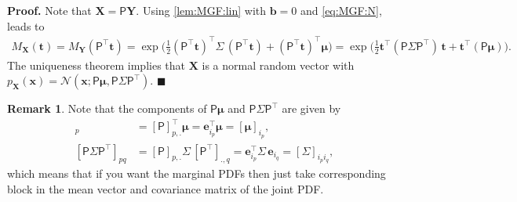 \documentclass[10pt]{article}
\theoremstyle{definition}
\newtheorem*{rem}{Remark}
\newenvironment{prf}{\noindent\textbf{Proof.}}{\hfill$\blacksquare$}
\begin{document}
\begin{prf}
Note that $\mathbf{X}=\mathsf{P}\mathbf{Y}$. Using \cref{lem:MGF:lin} with $\mathbf{b}=0$ and \cref{eq:MGF:N}, leads to
\begin{align*}
M_{\mathbf{X}}(\mathbf{t}) = M_{\mathbf{Y}}(\mathsf{P}^{\top}\mathbf{t})
= \exp\Big(\frac{1}{2}(\mathsf{P}^{\top}\mathbf{t})^{\top}\mathsf{\Sigma}\,(\mathsf{P}^{\top}\mathbf{t})
+(\mathsf{P}^{\top}\mathbf{t})^{\top}\boldsymbol{\mu}\Big)
= \exp\Big(\frac{1}{2}\mathbf{t}^{\top}(\mathsf{P}\mathsf{\Sigma}\mathsf{P}^{\top})\,\mathbf{t}
+\mathbf{t}^{\top}(\mathsf{P}\boldsymbol{\mu})\Big).
\end{align*}
The uniqueness theorem implies that $\mathbf{X}$ is a normal random vector with $p_{\mathbf{X}}(\mathbf{x})=\mathcal{N}(\mathbf{x};\mathsf{P}\boldsymbol{\mu},\mathsf{P}\mathsf{\Sigma}\mathsf{P}^{\top})$. 
\end{prf}
\begin{rem}
Note that the components of $\mathsf{P}\boldsymbol{\mu}$ and $\mathsf{P}\mathsf{\Sigma}\mathsf{P}^{\top}$ are given by
\begin{align*}
[\mathsf{P}\boldsymbol{\mu}]_p &= [\mathsf{P}]_{p,\boldsymbol{.}}^{\top}\boldsymbol{\mu} 
= \mathbf{e}_{i_p}^{\top}\boldsymbol{\mu} 
= [\boldsymbol{\mu}]_{i_p}, \\
[\mathsf{P}\mathsf{\Sigma}\mathsf{P}^{\top}]_{pq} &= [\mathsf{P}]_{p,\boldsymbol{.}}\mathsf{\Sigma}\,[\mathsf{P}^{\top}]_{\boldsymbol{.},q} 
= \mathbf{e}_{i_p}^{\top}\mathsf{\Sigma}\,\mathbf{e}_{i_q}
= [\mathsf{\Sigma}]_{i_pi_q},
\end{align*}
which means that if you want the marginal PDFs then just take corresponding block in the mean vector and covariance matrix of the joint PDF.
\end{rem}
\end{document}
